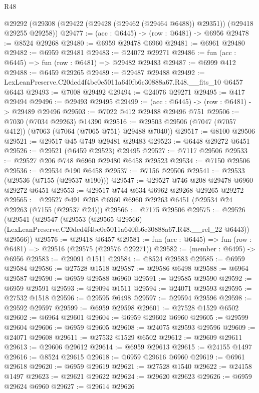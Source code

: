 \begin{lexlean}{R48}
\begin{coremodule}
  @29292 (@29308 (@29422 (@29428 (@29462 (@29464 @6488)) @29351)) (@29418 @29255 @29258))
@29477 := (acc : @6445) -> (row : @6481) -> @6956
@29478 := @8524 @29268
@29480 := @6959 @29478 @6960
@29481 := @6961 @29480
@29482 := @6959 @29481
@29483 := @24072 @29271
@29486 := fun (acc : @6445) => fun (row : @6481) => @29482 @29483
@29487 := @6999 @412
@29488 := @6459 @29265
@29489 := @29487 @29488
@29492 := LexLeanPreserve.C20ded4f4be0e5011a640fb6c30888a67.R48.__fits_10 @6457 @6443
@29493 := @7008 @29492
@29494 := @24076 @29271
@29495 := @417 @29494
@29496 := @29493 @29495
@29499 := (acc : @6445) -> (row : @6481) -> @29489 @29496
@29503 := @7022 @412 @29488 @29496 @751
@29506 := @7030 (@7034 @29263) @14390
@29516 := @29503 @29506 (@7047 (@7057 @412)) (@7063 (@7064 (@7065 @751) @29488 @7040))
@29517 := @8100 @29506
@29521 := @29517 @45 @749 @29481 @29483
@29523 := @6448 @29272 @6451
@29526 := @29521 (@6459 @29523) @29495
@29527 := @7117 @29506
@29533 := @29527 @206 @748 @6960 @29480 @6458 @29523
@29534 := @7150 @29506
@29536 := @29534 @190 @6458
@29537 := @7156 @29506
@29541 := @29533 (@29536 (@7155 (@29537 @190)))
@29547 := @29527 @746 @208 @29478 @6960 @29272 @6451
@29553 := @29517 @744 @634 @6962 @29268 @29265 @29272
@29565 := @29527 @491 @208 @6960 @6960 @29263 @6451 (@29534 @24 @29263 (@7155 (@29537 @24)))
@29566 := @7175 @29506
@29575 := @29526
    (@29541
      (@29547
        (@29553
          (@29565 @29566)
          (LexLeanPreserve.C20ded4f4be0e5011a640fb6c30888a67.R48.__rel_22 @6443))
        @29566))
@29576 := @29418 @6457
@29581 := fun (acc : @6445) => fun (row : @6481) => @29516 (@29575 (@29576 @29271))
@29582 := (member : @6495) -> @6956
@29583 := @29091 @1511
@29584 := @8524 @29583
@29585 := @6959 @29584
@29586 := @27528 @1518
@29587 := @29586 @6498
@29588 := @6964 @29587
@29590 := @6959 @29588 @6960
@29591 := @29585 @29590
@29592 := @6959 @29591
@29593 := @29094 @1511
@29594 := @24071 @29593
@29595 := @27532 @1518
@29596 := @29595 @6498
@29597 := @29594 @29596
@29598 := @29592 @29597
@29599 := @6959 @29598
@29601 := @27528 @1529 @6502
@29602 := @6964 @29601
@29604 := @6959 @29602 @6960
@29605 := @29599 @29604
@29606 := @6959 @29605
@29608 := @24075 @29593 @29596
@29609 := @24071 @29608
@29611 := @27532 @1529 @6502
@29612 := @29609 @29611
@29613 := @29606 @29612
@29614 := @6959 @29613
@29615 := @24155 @1497
@29616 := @8524 @29615
@29618 := @6959 @29616 @6960
@29619 := @6961 @29618
@29620 := @6959 @29619
@29621 := @27528 @1540
@29622 := @24158 @1497
@29623 := @29621 @29622
@29624 := @29620 @29623
@29626 := @6959 @29624 @6960
@29627 := @29614 @29626

\end{coremodule}
\end{lexlean}
